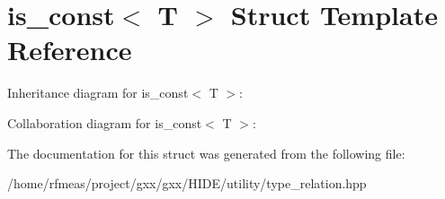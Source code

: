 \hypertarget{structis__const}{}\section{is\+\_\+const$<$ T $>$ Struct Template Reference}
\label{structis__const}


Inheritance diagram for is\+\_\+const$<$ T $>$\+:


Collaboration diagram for is\+\_\+const$<$ T $>$\+:


The documentation for this struct was generated from the following file\+:\begin{DoxyCompactItemize}
\item 
/home/rfmeas/project/gxx/gxx/\+H\+I\+D\+E/utility/type\+\_\+relation.\+hpp\end{DoxyCompactItemize}
